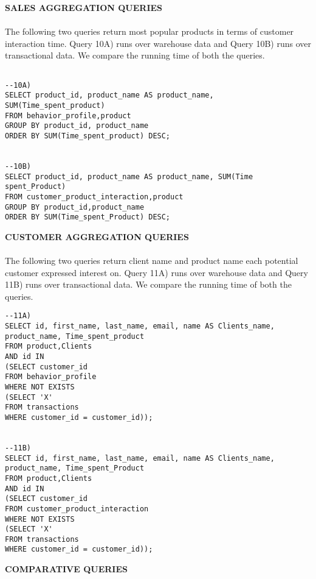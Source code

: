 {\large\textbf{SALES AGGREGATION QUERIES}}\\\\
The following two queries return most popular products in terms of customer interaction time. Query 10A) runs over warehouse data and Query 10B) runs over transactional data. We compare the running time of both the queries.
\begin{lstlisting}

--10A)
SELECT product_id, product_name AS product_name, SUM(Time_spent_product)
FROM behavior_profile,product
GROUP BY product_id, product_name
ORDER BY SUM(Time_spent_product) DESC;


--10B)
SELECT product_id, product_name AS product_name, SUM(Time spent_Product)
FROM customer_product_interaction,product
GROUP BY product_id,product_name
ORDER BY SUM(Time_spent_Product) DESC;
\end{lstlisting}
{\large\textbf{CUSTOMER AGGREGATION QUERIES}}\\\\
The following two queries return client name and product name each potential customer expressed interest on. Query 11A) runs over warehouse data and Query 11B) runs over transactional data. We compare the running time of both the queries.
\begin{lstlisting}
--11A)
SELECT id, first_name, last_name, email, name AS Clients_name, product_name, Time_spent_product
FROM product,Clients
AND id IN
(SELECT customer_id
FROM behavior_profile
WHERE NOT EXISTS
(SELECT 'X'
FROM transactions
WHERE customer_id = customer_id));


--11B)
SELECT id, first_name, last_name, email, name AS Clients_name, product_name, Time_spent_Product
FROM product,Clients
AND id IN
(SELECT customer_id
FROM customer_product_interaction
WHERE NOT EXISTS
(SELECT 'X'
FROM transactions
WHERE customer_id = customer_id));
\end{lstlisting}
{\large\textbf{COMPARATIVE QUERIES }}
